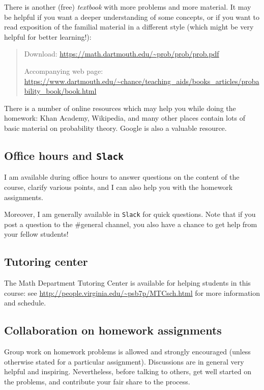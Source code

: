 \documentclass[oneside,11pt]{amsart}
\begin{document}
There is another (free) \emph{textbook} with more problems and more material. It may be helpful if you want
a deeper understanding of some concepts, or if you want to read exposition of the familial material
in a different style (which might be very helpful for better learning!):
\begin{quote}
	Download: \url{https://math.dartmouth.edu/~prob/prob/prob.pdf}

	\noindent
	Accompanying web page: \url{https://www.dartmouth.edu/~chance/teaching_aids/books_articles/probability_book/book.html}
\end{quote}

There is a number of online resources which may help you while doing the homework:
Khan Academy, Wikipedia, and many other 
places contain lots of basic material on probability theory. Google
is also a valuable resource.

\subsection{Office hours and \texttt{Slack}}

I am available during office hours to answer questions on the content of the 
course, clarify various points, and I can also help you with the homework assignments. 

Moreover, I am generally available in \texttt{Slack} for quick questions.
Note that if you post a question to the \#general channel, 
you also have a chance to get help from your fellow students!

\subsection{Tutoring center}

The Math Department Tutoring Center is available for helping students in this course: 
see \url{http://people.virginia.edu/~psb7p/MTCsch.html}
for more information and schedule. 

\subsection{Collaboration on homework assignments}
\label{collaboration}

Group work on homework problems is allowed and strongly encouraged (unless
otherwise stated for a particular assignment). Discussions are in general very
helpful and inspiring. Nevertheless, before talking to others, get well started
on the problems, and contribute your fair share to the process. 
\end{document}
